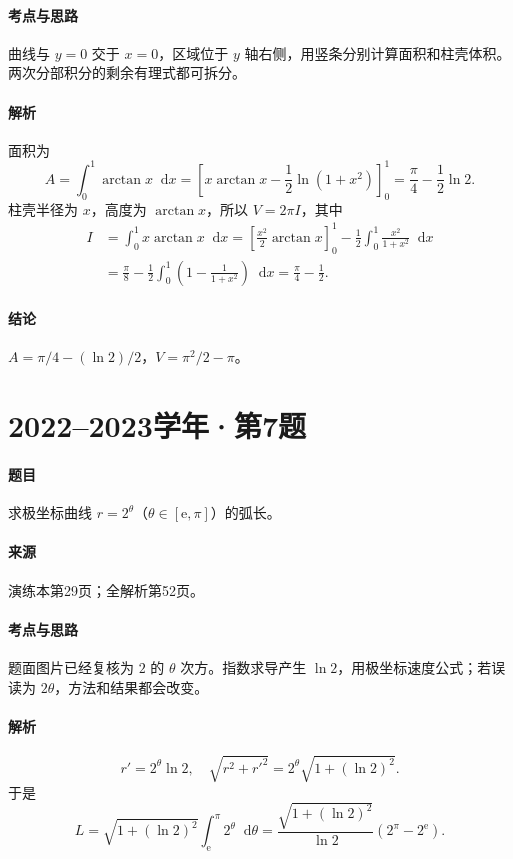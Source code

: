 \documentclass[UTF8,fontset=fandol,12pt,oneside,openany]{ctexrep}
\newcommand{\dd}{\mathop{}\!\mathrm d}
\newcommand{\ee}{\mathrm e}
\theoremstyle{definition}
\begin{document}
\paragraph{考点与思路}曲线与 $y=0$ 交于 $x=0$，区域位于 $y$ 轴右侧，用竖条分别计算面积和柱壳体积。两次分部积分的剩余有理式都可拆分。
\paragraph{解析}面积为
\[
 A=\int_0^1\arctan x\dd x
 =\left[x\arctan x-\frac12\ln(1+x^2)\right]_0^1
 =\frac\pi4-\frac12\ln2.
\]
柱壳半径为 $x$，高度为 $\arctan x$，所以 $V=2\pi I$，其中
\begin{align*}
 I&=\int_0^1x\arctan x\dd x
 =\left[\frac{x^2}2\arctan x\right]_0^1
 -\frac12\int_0^1\frac{x^2}{1+x^2}\dd x\\
 &=\frac\pi8-\frac12\int_0^1\left(1-\frac1{1+x^2}\right)\dd x
 =\frac\pi4-\frac12.
\end{align*}
\paragraph{结论}$A=\pi/4-(\ln2)/2$，$V=\pi^2/2-\pi$。

\par\addvspace{18pt}\noindent\begin{minipage}{\linewidth}
\section{2022--2023学年·第7题}
\paragraph{题目}求极坐标曲线 $r=2^\theta$（$\theta\in[\ee,\pi]$）的弧长。
\paragraph{来源}演练本第29页；全解析第52页。
\end{minipage}\par
\paragraph{考点与思路}题面图片已经复核为 $2$ 的 $\theta$ 次方。指数求导产生 $\ln2$，用极坐标速度公式；若误读为 $2\theta$，方法和结果都会改变。
\paragraph{解析}
\[
 r'=2^\theta\ln2,
 \quad \sqrt{r^2+r'^2}=2^\theta\sqrt{1+(\ln2)^2}.
\]
于是
\[
 L=\sqrt{1+(\ln2)^2}\int_\ee^\pi2^\theta\dd\theta
 =\frac{\sqrt{1+(\ln2)^2}}{\ln2}(2^\pi-2^\ee).
\]
\end{document}
